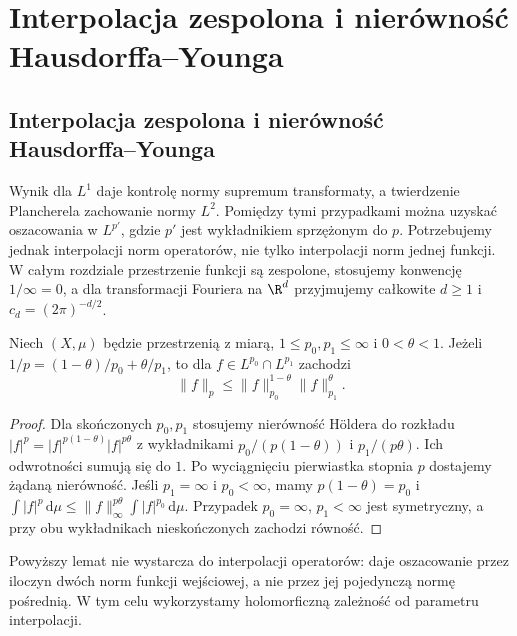 \section{Interpolacja zespolona i nierówność Hausdorffa--Younga}
\providecommand{\atlasref}[2]{#2}

\subsection{Interpolacja zespolona i nierówność Hausdorffa--Younga}

Wynik dla $L^1$ daje kontrolę normy supremum transformaty,
a twierdzenie Plancherela zachowanie normy $L^2$.
Pomiędzy tymi przypadkami można uzyskać oszacowania w
$L^{p'}$, gdzie $p'$ jest wykładnikiem sprzężonym do $p$.
Potrzebujemy jednak interpolacji norm operatorów, nie tylko
interpolacji norm jednej funkcji. W całym rozdziale
przestrzenie funkcji są zespolone, stosujemy konwencję
$1/\infty=0$, a dla transformacji Fouriera na $\R^d$
przyjmujemy całkowite $d\ge1$ i $c_d=(2\pi)^{-d/2}$.

\begin{lemat}
\label{lem:dt-interpolation-function}
Niech $(X,\mu)$ będzie przestrzenią z miarą,
$1\le p_0,p_1\le\infty$ i $0<\theta<1$. Jeżeli
$1/p=(1-\theta)/p_0+\theta/p_1$, to dla
$f\in L^{p_0}\cap L^{p_1}$ zachodzi
\[
 \|f\|_p\le\|f\|_{p_0}^{1-\theta}\|f\|_{p_1}^{\theta}.
\]
\end{lemat}
\begin{proof}
Dla skończonych $p_0,p_1$ stosujemy nierówność Höldera
do rozkładu $|f|^p=|f|^{p(1-\theta)}|f|^{p\theta}$
z wykładnikami $p_0/(p(1-\theta))$ i $p_1/(p\theta)$.
Ich odwrotności sumują się do $1$. Po wyciągnięciu
pierwiastka stopnia $p$ dostajemy żądaną nierówność.
Jeśli $p_1=\infty$ i $p_0<\infty$, mamy
$p(1-\theta)=p_0$ i
$\int |f|^p\,\mathrm d\mu
\le\|f\|_\infty^{p\theta}\int |f|^{p_0}\,\mathrm d\mu$.
Przypadek $p_0=\infty$, $p_1<\infty$ jest symetryczny,
a przy obu wykładnikach nieskończonych zachodzi równość.
\end{proof}

Powyższy lemat nie wystarcza do interpolacji operatorów:
daje oszacowanie przez iloczyn dwóch norm funkcji
wejściowej, a nie przez jej pojedynczą normę pośrednią.
W tym celu wykorzystamy holomorficzną zależność od
parametru interpolacji.

